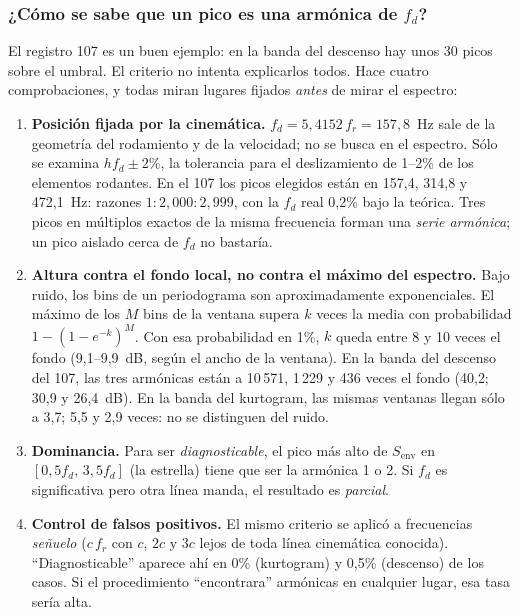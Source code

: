 \documentclass[11pt,a4paper]{article}
\begin{document}
\subsubsection{¿Cómo se sabe que un pico es una armónica de \texorpdfstring{$f_d$}{fd}?}\label{sec:armonica}
El registro 107 es un buen ejemplo: en la banda del descenso hay unos 30 picos sobre el umbral. El criterio no intenta explicarlos todos. Hace cuatro comprobaciones, y todas miran lugares fijados \emph{antes} de mirar el espectro:
\begin{enumerate}[itemsep=2pt]
\item \textbf{Posición fijada por la cinemática.} $f_d=5{,}4152\,f_r=157{,}8$~Hz sale de la geometría del rodamiento y de la velocidad; no se busca en el espectro. Sólo se examina $hf_d\pm2\%$, la tolerancia para el deslizamiento de 1--2\% de los elementos rodantes. En el 107 los picos elegidos están en 157{,}4, 314{,}8 y 472{,}1~Hz: razones $1:2{,}000:2{,}999$, con la $f_d$ real 0{,}2\% bajo la teórica. Tres picos en múltiplos exactos de la misma frecuencia forman una \emph{serie armónica}; un pico aislado cerca de $f_d$ no bastaría.
\item \textbf{Altura contra el fondo local, no contra el máximo del espectro.} Bajo ruido, los bins de un periodograma son aproximadamente exponenciales. El máximo de los $M$ bins de la ventana supera $k$ veces la media con probabilidad $1-(1-e^{-k})^M$. Con esa probabilidad en 1\%, $k$ queda entre 8 y 10 veces el fondo (9{,}1--9{,}9~dB, según el ancho de la ventana). En la banda del descenso del 107, las tres armónicas están a 10\,571, 1\,229 y 436 veces el fondo (40{,}2; 30{,}9 y 26{,}4~dB). En la banda del kurtogram, las mismas ventanas llegan sólo a 3{,}7; 5{,}5 y 2{,}9 veces: no se distinguen del ruido.
\item \textbf{Dominancia.} Para ser \emph{diagnosticable}, el pico más alto de $S_{\mathrm{env}}$ en $[0{,}5f_d,\,3{,}5f_d]$ (la estrella) tiene que ser la armónica 1 o 2. Si $f_d$ es significativa pero otra línea manda, el resultado es \emph{parcial}.
\item \textbf{Control de falsos positivos.} El mismo criterio se aplicó a frecuencias \emph{señuelo} ($c\,f_r$ con $c$, $2c$ y $3c$ lejos de toda línea cinemática conocida). ``Diagnosticable'' aparece ahí en 0\% (kurtogram) y 0{,}5\% (descenso) de los casos. Si el procedimiento ``encontrara'' armónicas en cualquier lugar, esa tasa sería alta.
\end{enumerate}
\end{document}
